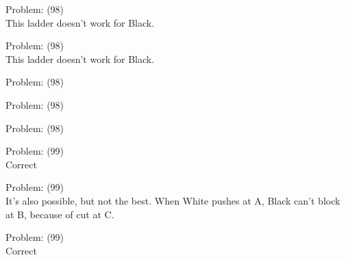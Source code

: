 \documentclass[11pt]{article}
\begin{document}
\begin{minipage}[t]{0.5\textwidth}
  {\centering
  
Problem: (98)\\
This ladder doesn't work for Black.\\
  }
\end{minipage}
\begin{minipage}[t]{0.5\textwidth}
  {\centering
  
Problem: (98)\\
This ladder doesn't work for Black.\\
  }
\end{minipage}
\begin{minipage}[t]{0.5\textwidth}
  {\centering
  
Problem: (98)\\
  }
\end{minipage}
\begin{minipage}[t]{0.5\textwidth}
  {\centering
  
Problem: (98)\\
  }
\end{minipage}
\begin{minipage}[t]{0.5\textwidth}
  {\centering
  
Problem: (98)\\
  }
\end{minipage}
\begin{minipage}[t]{0.5\textwidth}
  {\centering
  
Problem: (99)\\
Correct\\
  }
\end{minipage}
\begin{minipage}[t]{0.5\textwidth}
  {\centering
  
Problem: (99)\\
It's also possible, but not the best. When White pushes at A, Black can't block at B, because of cut at C.\\
  }
\end{minipage}
\begin{minipage}[t]{0.5\textwidth}
  {\centering
  
Problem: (99)\\
Correct\\
  }
\end{minipage}
\end{document}
